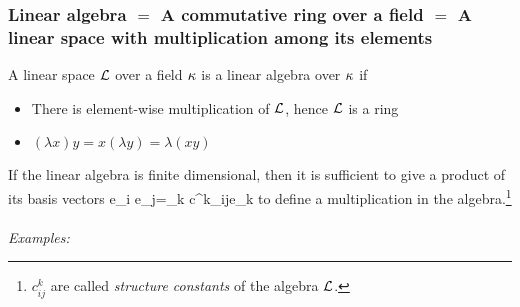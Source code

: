 \subsubsection{Linear algebra $=$ A commutative ring over a field $=$ A linear space with multiplication among its elements}
A linear space $\mathcal{L}$ over a field $\kappa$ is a linear algebra over $\kappa$ if
\begin{itemize}
	\item There is element-wise multiplication of $\mathcal{L}$, hence $\mathcal{L}$ is a ring
	\item $(\lambda x)y=x(\lambda y)=\lambda (xy)$
\end{itemize}
If the linear algebra is finite dimensional, then it is sufficient to give a product of its basis vectors
\be 
e_i e_j=\sum\limits_k c^k_{ij}e_k
\ee 
to define a multiplication in the algebra.\footnote{
$c^k_{ij}$ are called \emph{structure constants} of the algebra $\mathcal{L}$.
}\\\\
\emph{Examples:}
